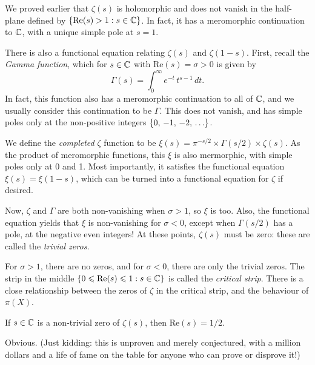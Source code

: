 \documentclass{article}
\begin{document}
\begin{remark}
    We proved earlier that $\zeta(s)$ is holomorphic and does not vanish in the half-plane defined by $\left\lbrace \mathrm{Re}(s) > 1 : s \in \mathbb{C} \right\rbrace$. In fact, it has a meromorphic continuation to $\mathbb{C}$, with a unique simple pole at $s = 1$.
    
    There is also a functional equation relating $\zeta(s)$ and $\zeta(1-s)$. First, recall the \textit{Gamma function}, which for $s \in \mathbb{C}$ with $\mathrm{Re}(s) = \sigma > 0$ is given by
    \[
	\Gamma(s) = \int_0^\infty e^{-t} \, t^{s-1} \, dt.
	\]
	In fact, this function also has a meromorphic continuation to all of $\mathbb{C}$, and we usually consider this continuation to be $\Gamma$. This does not vanish, and has simple poles only at the non-positive integers $\set{0, \, -1, \, -2, \, \dots}$.
	
	We define the \textit{completed} $\zeta$ function to be
	$\xi(s) = \pi^{-s/2} \times \Gamma(s/2) \times \zeta(s)$.
	As the product of meromorphic functions, this $\xi$ is also mermorphic, with simple poles only at 0 and 1. Most importantly, it satisfies the functional equation $\xi(s) = \xi(1-s)$, which can be turned into a functional equation for $\zeta$ if desired.
	
	Now, $\zeta$ and $\Gamma$ are both non-vanishing when $\sigma > 1$, so $\xi$ is too. Also, the functional equation yields that $\xi$ is non-vanishing for $\sigma < 0$, except when $\Gamma(s/2)$ has a pole, at the negative even integers! At these points, $\zeta(s)$ must be zero: these are called the \textit{trivial zeros.}
\end{remark}

\begin{note}
	For $\sigma > 1$, there are no zeros, and for $\sigma < 0$, there are only the trivial zeros. The strip in the middle $\left\lbrace 0 \leqslant \mathrm{Re}(s) \leqslant 1: s \in \mathbb{C} \right\rbrace$ is called the \textit{critical strip}. There is a close relationship between the zeros of $\zeta$ in the critical strip, and the behaviour of $\pi(X)$.
\end{note}

\begin{proposition}
    If $s \in \mathbb{C}$ is a non-trivial zero of $\zeta(s)$, then $\mathrm{Re}(s) = 1/2$.
\end{proposition}

\begin{prf}
    Obvious. (Just kidding: this is unproven and merely conjectured, with a million dollars and a life of fame on the table for anyone who can prove or disprove it!)
\end{prf}
\end{document}
